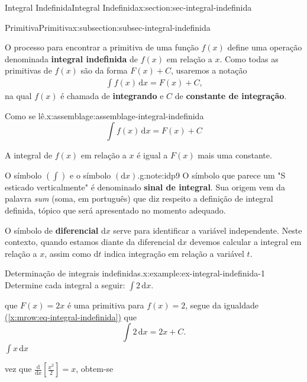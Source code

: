 \documentclass[oneside,10pt,]{article}
\newcommand{\xreffont}{\relax}
\newcommand{\terminology}[1]{\textbf{#1}}
\numberwithin{equation}{section}
\newcommand{\dd}{\mathrm{d}}
\newcommand{\integral}[2]{\displaystyle\int {#1}\,\dd {#2}}
\begin{document}
\begin{sectionptx}{Integral Indefinida}{}{Integral Indefinida}{}{}{x:section:sec-integral-indefinida}
\begin{subsectionptx}{Primitiva}{}{Primitiva}{}{}{x:subsection:subsec-integral-indefinida}
\par
O processo para encontrar a primitiva de uma função \(f(x)\) define uma operação denominada \terminology{integral indefinida}  de \(f(x)\) em relação a \(x\). Como todas as primitivas de \(f(x)\) são da forma \(F(x) + C\), usaremos a notação%
\begin{gather}
\integral{f(x)}{x}=F(x) + C \text{,}\label{x:mrow:eq-integral-indefinida}
\end{gather}
na qual \(f(x)\) é chamada de \terminology{integrando}  e \(C\)  de \terminology{constante de integração}.%
\begin{assemblage}{Como se lê.}{x:assemblage:assemblage-integral-indefinida}%
%
\begin{equation*}
\integral{f(x)}{x}=F(x) + C
\end{equation*}
%
\par
A integral de \(f(x)\) em relação a \(x\) é igual a \(F(x)\) mais uma constante.%
\end{assemblage}
\begin{note}{O símbolo \((\displaystyle\int)\) e o símbolo \((\dd x)\).}{g:note:idp9}%
O símbolo que parece um "S esticado verticalmente" é denominado \terminology{sinal de integral}. Sua origem vem da palavra \emph{sum} (soma, em português) que diz respeito a definição de integral definida, tópico que será apresentado no momento adequado.%
\par
O símbolo de \terminology{diferencial} \(\dd x\) serve para identificar a variável independente. Neste contexto, quando estamos diante da diferencial\footnotemark{}   \(\dd x\) devemos calcular a integral em relação a \(x\), assim como \(\dd t\) indica integração em relação a variável \(t\).%
\end{note}
%
\begin{example}{Determinação de integrais indefinidas.}{x:example:ex-integral-indefinida-1}%
Determine cada integral a seguir: \(\integral{2}{x}.\)%
\par\smallskip%
 que \(F(x)=2x\) é uma primitiva para \(f(x)=2\), segue da igualdade \hyperref[x:mrow:eq-integral-indefinida]{({\xreffont\ref{x:mrow:eq-integral-indefinida}})} que%
\begin{equation*}
\integral{2}{x}=2x + C\text{.}
\end{equation*}
%
 \(\integral{x}{x}\)%
\par\smallskip%
\noindentUma vez que \(\frac{\dd}{\dd x}[\frac{x^2}{2}]=x\), obtem-se%

\end{example}
\end{subsectionptx}
\end{sectionptx}
\end{document}
